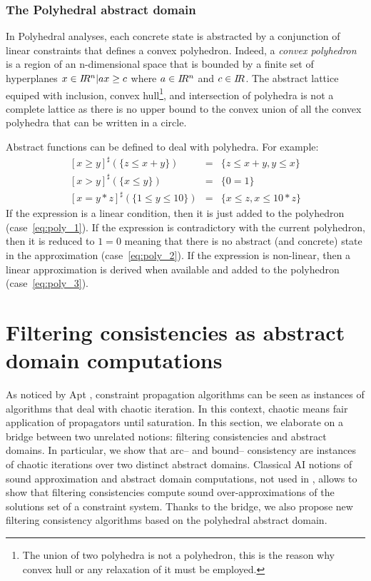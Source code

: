 \documentclass[submission,copyright,creativecommons]{eptcs}
\newcommand{\R}{I\hspace{-.2em}R}
\newcommand{\sh}[1]{\ensuremath{#1^\sharp}}
\begin{document}
\subsubsection{The Polyhedral abstract domain}
\label{polyhedra}

In Polyhedral analyses, each concrete state is abstracted by a conjunction of linear
constraints that defines a convex polyhedron. Indeed, a {\it convex polyhedron} is a region of an
n-dimensional space that is bounded by a finite set of hyperplanes ${x \in \R^n | ax \geq c}$ where $a \in \R^n$ and $c \in \R$.
 The abstract lattice equiped with
inclusion, convex hull\footnote{The union of two polyhedra is not a polyhedron, this is the reason why convex hull or any relaxation of it
must be employed.}, and intersection of polyhedra is not a complete lattice as there is no 
upper bound to the convex union of all the convex polyhedra that can be written in a circle.    

\noindent
Abstract functions can be defined to deal with polyhedra. For example:
\begin{eqnarray}
\sh{[x \geq y]}(\{z \leq  x + y\}) &=&  \{z \leq x + y, y \leq x\} \label{eq:poly_1}\\
\sh{[x > y ]}(\{x \leq y \}) &=& \{0 = 1\} \label{eq:poly_2}\\
\sh{[x = y * z]}(\{1 \leq y \leq 10\}) &=& \{x \leq z, x \leq 10*z\} \label{eq:poly_3}
\end{eqnarray}
\noindent 
If the expression is a linear condition, then it is just added to the polyhedron (case~\ref{eq:poly_1}). 
If the expression is contradictory with the current polyhedron, then it is reduced to $1=0$ meaning that
there is no abstract (and concrete) state in the approximation (case~\ref{eq:poly_2}). 
If the expression is non-linear, then a linear approximation is derived when available
and added to the polyhedron (case~\ref{eq:poly_3}). 


\section{Filtering consistencies as abstract domain computations}
\label{sec:absdom-cons}
As noticed by Apt \cite{Apt99a}, constraint propagation algorithms can be seen as
instances of algorithms that deal with chaotic iteration. In this context, chaotic means fair application of
propagators until saturation. In this section, we elaborate on a bridge between two
unrelated notions: filtering consistencies and abstract domains. In particular, we show that arc-- and 
bound-- consistency are instances of chaotic iterations over two distinct 
abstract domains. Classical AI notions of sound approximation and abstract domain
computations, not used in \cite{Apt99a}, allows to show that filtering consistencies compute sound 
over-approximations of the solutions set of a constraint system. Thanks to the bridge, we also propose new filtering
consistency algorithms based on the polyhedral abstract domain. 
\end{document}
